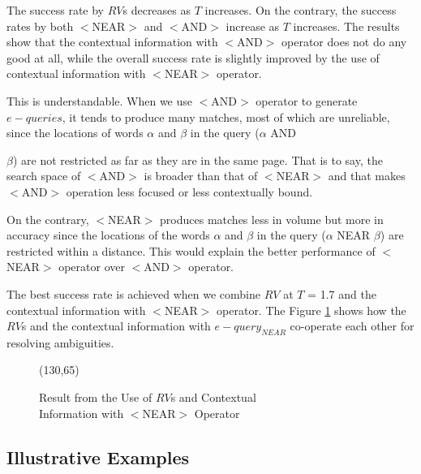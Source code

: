 The success rate by $RV$s decreases as $T$ increases. On the contrary, the success rates by both $<$NEAR$>$ and $<$AND$>$ increase as $T$ increases. The results show that the contextual information with $<$AND$>$ operator does not do any good at all, while the overall success rate is slightly improved by the use of contextual information with $<$NEAR$>$ operator. 

This is understandable. When we use $<$AND$>$ operator to generate ${e-queries}$, it tends to produce many matches, most of which are unreliable, since the locations of words $\alpha$ and $\beta$ in the query ($\alpha$ AND {$\beta$) are not restricted as far as they are in the same page. That is to say, the search space of $<$AND$>$ is broader than that of $<$NEAR$>$ and that makes $<$AND$>$ operation less focused or less contextually bound.

On the contrary, $<$NEAR$>$ produces matches less in volume but more in accuracy since the locations of the words $\alpha$ and $\beta$ in the query ($\alpha$ NEAR $\beta$) are restricted within a distance. This would explain the better performance of $<$NEAR$>$ operator over $<$AND$>$ operator.


The best success rate is achieved when we combine $RV$ at $T$ = 1.7 and the contextual information with $<$NEAR$>$ operator. The Figure \ref{fig2} shows how the $RV$s and the contextual information with ${e-query}_{NEAR}$ co-operate each other for resolving ambiguities.

\begin{figure}[htb]
\begin{center}
\atari(130,65)
\end{center}
\caption{Result from the Use of $RV$s and Contextual\\
Information with $<$NEAR$>$ Operator}
\label{fig2}
\end{figure}
\subsection{Illustrative Examples }
\label{illust}

}
